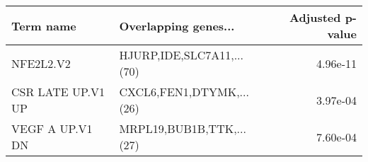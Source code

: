 \begin{tabular}{llr}
\toprule
        Term name &      Overlapping genes... &  Adjusted p-value \\
\midrule
        NFE2L2.V2 & HJURP,IDE,SLC7A11,...(70) &          4.96e-11 \\
CSR LATE UP.V1 UP &  CXCL6,FEN1,DTYMK,...(26) &          3.97e-04 \\
  VEGF A UP.V1 DN &  MRPL19,BUB1B,TTK,...(27) &          7.60e-04 \\
\bottomrule
\end{tabular}
